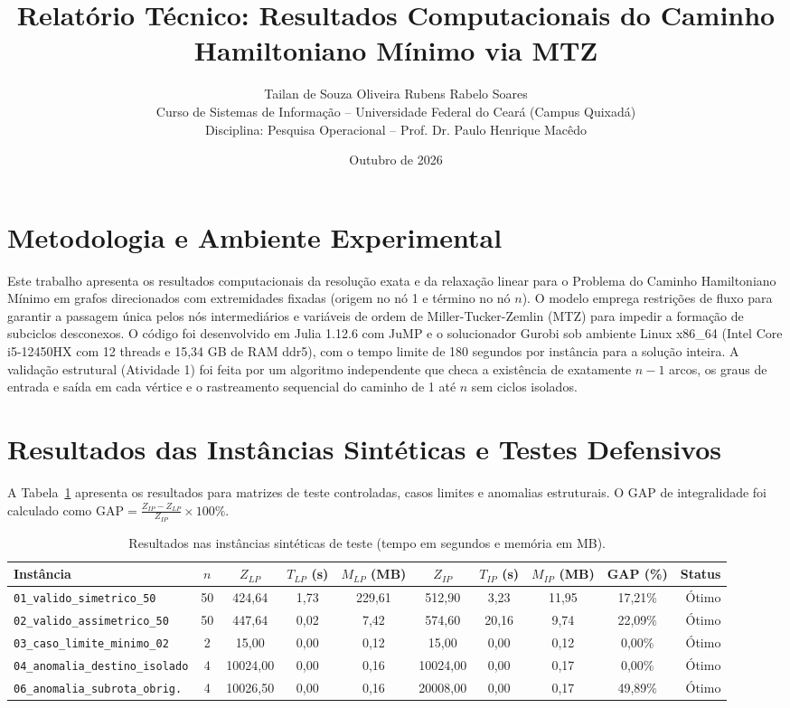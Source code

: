 \documentclass[10pt,a4paper]{article}
\title{\large\textbf{Relatório Técnico: Resultados Computacionais do Caminho Hamiltoniano Mínimo via MTZ}}
\author{Tailan de Souza Oliveira \quad Rubens Rabelo Soares \\
\small Curso de Sistemas de Informação -- Universidade Federal do Ceará (Campus Quixadá) \\
\small Disciplina: Pesquisa Operacional -- Prof. Dr. Paulo Henrique Macêdo}
\date{Outubro de 2026}
\begin{document}
\maketitle
\vspace{-1.8em}

\section{Metodologia e Ambiente Experimental}
Este trabalho apresenta os resultados computacionais da resolução exata e da relaxação linear para o Problema do Caminho Hamiltoniano Mínimo em grafos direcionados com extremidades fixadas (origem no nó 1 e término no nó $n$). O modelo emprega restrições de fluxo para garantir a passagem única pelos nós intermediários e variáveis de ordem de Miller-Tucker-Zemlin (MTZ) para impedir a formação de subciclos desconexos. O código foi desenvolvido em Julia 1.12.6 com JuMP e o solucionador Gurobi sob ambiente Linux x86\_64 (Intel Core i5-12450HX com 12 threads e 15,34 GB de RAM ddr5), com o tempo limite de 180 segundos por instância para a solução inteira. A validação estrutural (Atividade 1) foi feita por um algoritmo independente que checa a existência de exatamente $n-1$ arcos, os graus de entrada e saída em cada vértice e o rastreamento sequencial do caminho de 1 até $n$ sem ciclos isolados.

\section{Resultados das Instâncias Sintéticas e Testes Defensivos}
A Tabela~\ref{tab:sinteticas} apresenta os resultados para matrizes de teste controladas, casos limites e anomalias estruturais. O GAP de integralidade foi calculado como $\text{GAP} = \frac{Z_{IP} - Z_{LP}}{Z_{IP}} \times 100\%$.

\begin{table}[H]
\centering
\scriptsize
\setlength{\tabcolsep}{3.5pt}
\caption{Resultados nas instâncias sintéticas de teste (tempo em segundos e memória em MB).}
\label{tab:sinteticas}
\begin{tabular}{lccccccccr}
\toprule
Instância & $n$ & $Z_{LP}$ & $T_{LP}$ (s) & $M_{LP}$ (MB) & $Z_{IP}$ & $T_{IP}$ (s) & $M_{IP}$ (MB) & GAP (\%) & Status \\
\midrule
\texttt{01\_valido\_simetrico\_50} & 50 & 424,64 & 1,73 & 229,61 & 512,90 & 3,23 & 11,95 & 17,21\% & Ótimo \\
\texttt{02\_valido\_assimetrico\_50} & 50 & 447,64 & 0,02 & 7,42 & 574,60 & 20,16 & 9,74 & 22,09\% & Ótimo \\
\texttt{03\_caso\_limite\_minimo\_02} & 2 & 15,00 & 0,00 & 0,12 & 15,00 & 0,00 & 0,12 & 0,00\% & Ótimo \\
\texttt{04\_anomalia\_destino\_isolado} & 4 & 10024,00 & 0,00 & 0,16 & 10024,00 & 0,00 & 0,17 & 0,00\% & Ótimo \\
\texttt{06\_anomalia\_subrota\_obrig.} & 4 & 10026,50 & 0,00 & 0,16 & 20008,00 & 0,00 & 0,17 & 49,89\% & Ótimo \\
\bottomrule
\end{tabular}
\end{table}
\end{document}
